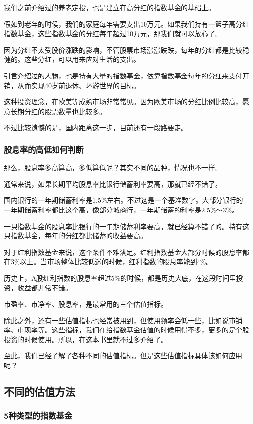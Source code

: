 我们之前介绍过的养老定投，也是建立在高分红的指数基金的基础上。

假如到老年的时候，我们的家庭每年需要支出10万元。如果我们持有一篮子高分红指数基金，这些指数基金的分红每年超过10万元，那我们就可以放心了。

因为分红不太受股价涨跌的影响，不管股票市场涨涨跌跌，每年的分红都是比较稳健的。这些分红，可以用来应对生活的支出。

引言介绍过的人物，也是持有大量的指数基金，依靠指数基金每年的分红来支付开销，从而实现40岁前退休、环游世界的目标。

这种投资理念，在欧美等成熟市场非常常见。因为欧美市场的分红比例比较高，愿意长期分红的股票数量也比较多。

不过比较遗憾的是，国内距离这一步，目前还有一段路要走。

\subsubsection{股息率的高低如何判断}

那么，股息率多高算高，多低算低呢？其实不同的品种，情况也不一样。

通常来说，如果长期平均股息率比银行储蓄利率要高，那就已经不错了。

国内银行的一年期储蓄利率是1.5\%左右。不过这是一个基准数字。大部分银行的一年期储蓄利率都比这个高，像部分城商行，一年期储蓄的利率是2.5\%～3\%。

一只指数基金的股息率比银行的一年期储蓄利率要高，就已经算不错了的。持有这只指数基金，每年的分红都比储蓄的收益要高。

对于红利指数基金来说，这个条件不难满足。红利指数基金大部分时候的股息率都在3\%以上。当市场整体比较低迷的时候，红利指数的股息率能到4\%。

历史上，A股红利指数的股息率超过5\%的时候，都是历史大底，在这段时间里投资，收益都非常不错。

市盈率、市净率、股息率，是最常用的三个估值指标。

除此之外，还有一些估值指标也经常被用到，但使用频率会低一些，比如说市销率、市现率等。这些指标，我们在给指数基金估值的时候用得不多，更多的是个股投资的时候使用。所以，在这本书里就不过多介绍了。

至此，我们已经了解了各种不同的估值指标。但是这些估值指标具体该如何应用呢？

\subsection{不同的估值方法}
\subsubsection{5种类型的指数基金}

